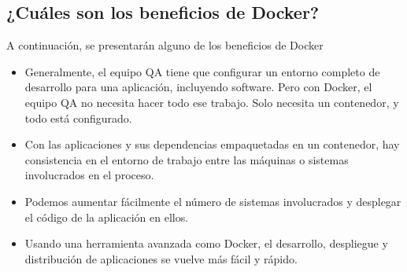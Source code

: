 \documentclass[12pt]{article}
\begin{document}
\subsection{¿Cuáles son los beneficios de Docker?}
\noindent
A continuación, se presentarán alguno de los beneficios de Docker
\begin{itemize}
    \item Generalmente, el equipo QA tiene que configurar un entorno completo de desarrollo para una aplicación, incluyendo software. Pero con Docker, el equipo QA no necesita hacer todo ese trabajo. Solo necesita un contenedor, y todo está configurado.
    \item Con las aplicaciones y sus dependencias empaquetadas en un contenedor, hay consistencia en el entorno de trabajo entre las máquinas o sistemas involucrados en el proceso.
    \item Podemos aumentar fácilmente el número de sistemas involucrados y desplegar el código de la aplicación en ellos.
    \item Usando una herramienta avanzada como Docker, el desarrollo, despliegue y distribución de aplicaciones se vuelve más fácil y rápido.
\end{itemize}
\end{document}
